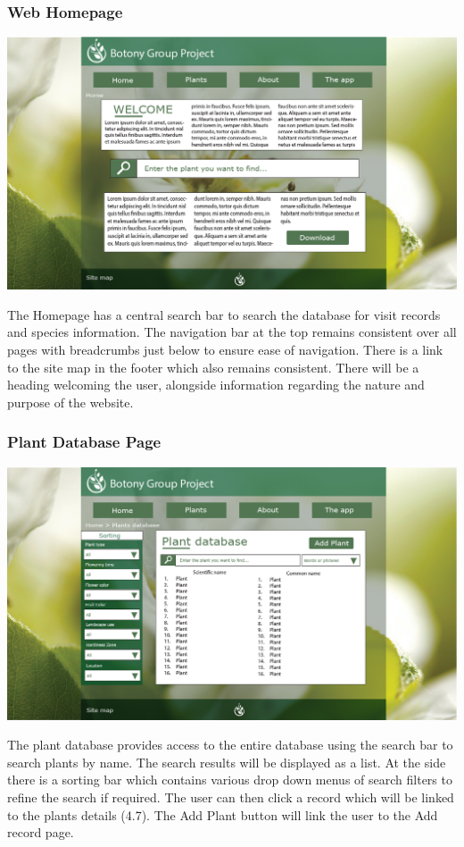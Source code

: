 		\subsubsection{Web Homepage}
			\begin{center}
				\includegraphics[scale=0.5]{uiDesign/uiwebimages/index.png}
			\end{center}
		The Homepage has a central search bar to search the database for visit records and species information. The navigation bar at the top remains consistent over all pages with breadcrumbs just below to ensure ease of navigation. There is a link to the site map in the footer which also remains consistent. There will be a heading welcoming the user, alongside information regarding the nature and purpose of the website. 

		\subsubsection{Plant Database Page}
			\begin{center}
				\includegraphics[scale=0.5]{uiDesign/uiwebimages/plantdb.png}
			\end{center}
		The plant database provides access to the entire database using the search bar to search plants by name. The search results will be displayed as a list. At the side there is a sorting bar which contains various drop down menus of search filters to refine the search if required. The user can then click a record which will be linked to the plants details (4.7). The Add Plant button will link the user to the Add record page.

